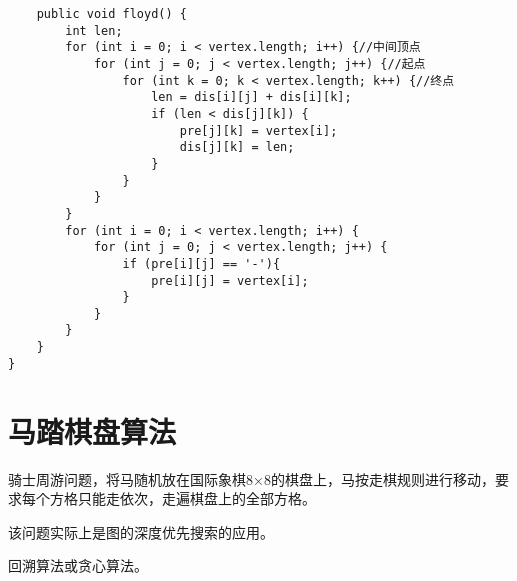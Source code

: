 \documentclass[a4paper]{report}
\begin{document}
\begin{lstlisting}
    public void floyd() {
        int len;
        for (int i = 0; i < vertex.length; i++) {//中间顶点
            for (int j = 0; j < vertex.length; j++) {//起点
                for (int k = 0; k < vertex.length; k++) {//终点
                    len = dis[i][j] + dis[i][k];
                    if (len < dis[j][k]) {
                        pre[j][k] = vertex[i];
                        dis[j][k] = len;
                    }
                }
            }
        }
        for (int i = 0; i < vertex.length; i++) {
            for (int j = 0; j < vertex.length; j++) {
                if (pre[i][j] == '-'){
                    pre[i][j] = vertex[i];
                }
            }
        }
    }
}
\end{lstlisting}
\section{马踏棋盘算法}
骑士周游问题，将马随机放在国际象棋8×8的棋盘上，马按走棋规则进行移动，要求每个方格只能走依次，走遍棋盘上的全部方格。

该问题实际上是图的深度优先搜索的应用。

回溯算法或贪心算法。
\end{document}
